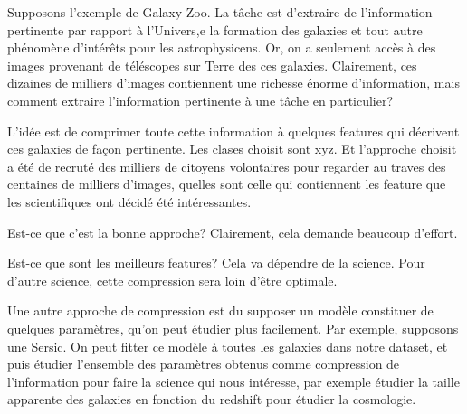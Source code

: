 
Supposons l'exemple de Galaxy Zoo. La tâche est d'extraire de l'information pertinente par rapport à l'Univers,e 
la formation des galaxies et tout autre phénomène d'intérêts pour les astrophysicens. Or, on a seulement accès à des images 
provenant de téléscopes sur Terre des ces galaxies. Clairement, ces dizaines de milliers d'images contiennent une richesse 
énorme d'information, mais comment extraire l'information pertinente à une tâche en particulier?

L'idée est de comprimer toute cette information à quelques features qui décrivent ces galaxies de façon pertinente. Les clases choisit sont xyz. 
Et l'approche choisit a été de recruté des milliers de citoyens volontaires pour regarder au traves des centaines de milliers d'images, quelles sont celle qui contiennent 
les feature que les scientifiques ont décidé été intéressantes. 

Est-ce que c'est la bonne approche? Clairement, cela demande beaucoup d'effort. 

Est-ce que sont les meilleurs features? Cela va dépendre de la science. Pour d'autre science, cette compression sera loin d'être optimale.

Une autre approche de compression est du supposer un modèle constituer de quelques paramètres, qu'on peut étudier plus facilement. Par exemple, supposons une 
Sersic. On peut fitter ce modèle à toutes les galaxies dans notre dataset, et puis étudier l'ensemble des paramètres obtenus comme 
compression de l'information pour faire la science qui nous intéresse, par exemple étudier la taille apparente des galaxies en fonction du redshift pour 
étudier la cosmologie.

